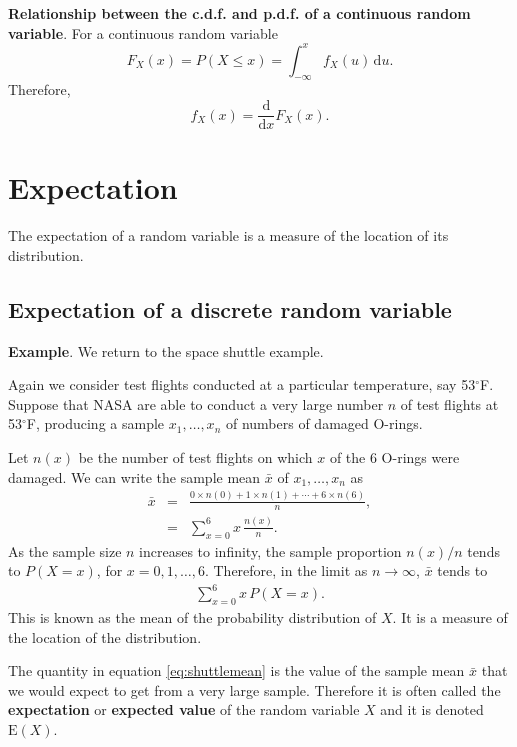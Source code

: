 \documentclass[
  british,
]{book}
\begin{document}
\textbf{Relationship between the c.d.f. and p.d.f. of a continuous random variable}. For a continuous random variable
\[ F_X(x) = P(X \leq x) = \int_{-\infty}^x f_X(u) \,\mathrm{d}u. \]
Therefore,
\[ f_X(x) = \frac{\mathrm{d}}{\mathrm{d}x} F_X(x). \]

\hypertarget{expectation}{%
\section{Expectation}\label{expectation}}

The expectation of a random variable is a measure of the location of its distribution.

\hypertarget{expectation-of-a-discrete-random-variable}{%
\subsection{Expectation of a discrete random variable}\label{expectation-of-a-discrete-random-variable}}

\textbf{Example}. We return to the space shuttle example.

Again we consider test flights conducted at a particular temperature, say 53\(^\circ\)F. Suppose that NASA are able to conduct a very large number \(n\) of test flights at 53\(^\circ\)F, producing a sample \(x_1,\ldots,x_n\) of numbers of damaged O-rings.

Let \(n(x)\) be the number of test flights on which \(x\) of the 6 O-rings were damaged. We can write the sample mean \(\bar{x}\) of \(x_1,\ldots,x_n\) as
\begin{eqnarray*}
\bar{x} &=& \frac{0 \times n(0) + 1 \times n(1) + \cdots + 6 \times n(6)}{n}, \\
&=& \sum_{x=0}^6 x\,\frac{n(x)}{n}.
\end{eqnarray*}
As the sample size \(n\) increases to infinity, the sample proportion \(n(x)/n\) tends to \(P(X=x)\), for \(x=0,1,\ldots,6\). Therefore, in the limit as \(n \rightarrow \infty\), \(\bar{x}\) tends to
\begin{eqnarray}
\sum_{x=0}^6 x\,P(X=x). 
\label{eq:shuttlemean}
\end{eqnarray}
This is known as the mean of the probability distribution of \(X\). It is a measure of the location of the distribution.

The quantity in equation \eqref{eq:shuttlemean} is the value of the sample mean \(\bar{x}\) that we would expect to get from a very large sample. Therefore it is often called the \textbf{expectation} or \textbf{expected value} of the random variable \(X\) and it is denoted \(\mathrm{E}(X)\).
\end{document}
